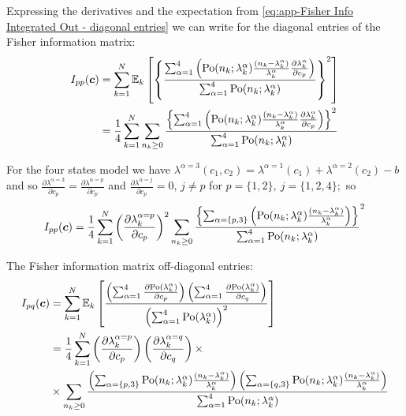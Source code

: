 Expressing the derivatives and the expectation from \autoref{eq:app-Fisher Info Integrated Out - diagonal entries} we can write for the diagonal entries of the Fisher information matrix:
%
\begin{alignat}{2}
	I_{pp}(\bm{c}) 
	& =\sum_{k=1}^N\mathbb{E}_k\left[\left\{ \frac{\sum_{\alpha=1}^4\left(\mathrm{Po}(n_k;\lambda_k^\alpha)\frac{(n_k-\lambda_k^\alpha)}{\lambda_k^\alpha}\frac{\partial\lambda_k^\alpha}{\partial c_p}\right)}{\sum_{\alpha=1}^4\mathrm{Po}(n_k;\lambda_k^\alpha)}\right\} ^2\right]\\
 	& =\frac{1}{4}\sum_{k=1}^N\sum_{n_k\geq0}\frac{\left\{ \sum_{\alpha=1}^4\left(\mathrm{Po}(n_k;\lambda_k^\alpha)\frac{(n_k-\lambda_k^\alpha)}{\lambda_k^\alpha}\frac{\partial\lambda_k^\alpha}{\partial c_p}\right)\right\} ^2}{\sum_{\alpha=1}^4\mathrm{Po}(n_k;\lambda_k^\alpha)}
\end{alignat}

For the four states model we have $\lambda^{\alpha=3}(c_1,c_2)=\lambda^{\alpha=1}(c_1)+\lambda^{\alpha=2}(c_2)-b$ and so $\frac{\partial\lambda^{\alpha=3}}{\partial c_p}=\frac{\partial\lambda^{\alpha=p}}{\partial c_p}$ and $\frac{\partial\lambda^{\alpha=j}}{\partial c_p}=0,\, j\neq p$ for $p=\{1,2\},\: j=\{1,2,4\};$ so 
%
\begin{equation}
	I_{pp}(\bm{c}) 
	=\frac{1}{4}\sum_{k=1}^N\left(\frac{\partial\lambda_k^{\alpha=p}}{\partial c_p}\right)^2\sum_{n_k\geq0}\frac{\left\{\sum_{\alpha=\{p,3\}}\left(\mathrm{Po}(n_k;\lambda_k^\alpha)\frac{(n_k-\lambda_k^\alpha)}{\lambda_k^\alpha}\right)\right\}}{\sum_{\alpha=1}^4\mathrm{Po}(n_k;\lambda_k^\alpha)} ^2
\end{equation}


The Fisher information matrix off-diagonal entries:
%
\begin{alignat}{2}
	I_{pq}(\bm{c}) 
	& =\sum_{k=1}^N\mathbb{E}_k\left[\frac{\left(\sum_{\alpha=1}^4\frac{\partial\mathrm{Po}(\lambda_k^\alpha)}{\partial c_p}\right)\left(\sum_{\alpha=1}^4\frac{\partial\mathrm{Po}(\lambda_k^\alpha)}{\partial c_q}\right)}{\left(\sum_{\alpha=1}^4\mathrm{Po}(\lambda_k^\alpha)\right)^2}\right] \\
 	& =\frac{1}{4}\sum_{k=1}^N\left(\frac{\partial\lambda_k^{\alpha=p}}{\partial c_p}\right)\left(\frac{\partial\lambda_k^{\alpha=q}}{\partial c_q}\right)\times\\
	&\times\sum_{n_k\geq0}\frac{\left(\sum_{\alpha=\{p,3\}}\mathrm{Po}(n_k;\lambda_k^\alpha)\frac{(n_k-\lambda_k^\alpha)}{\lambda_k^\alpha}\right)\left(\sum_{\alpha=\{q,3\}}\mathrm{Po}(n_k;\lambda_k^\alpha)\frac{(n_k-\lambda_k^\alpha)}{\lambda_k^\alpha}\right)}{\sum_{\alpha=1}^4\mathrm{Po}(n_k;\lambda_k^\alpha)}
	\label{eq:app-Fisher Info Integrated Out-off diagonal entries}
\end{alignat}

